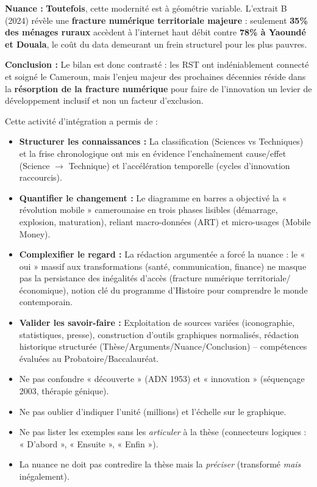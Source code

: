 \documentclass[11pt]{article}
\newcounter{popsec}
\newcounter{popsub}
\newcommand{\courssub}[1]{%
  \stepcounter{popsub}%
  \par\vspace{9pt}\noindent{\popxbold\fontsize{11.5}{13}\selectfont\color{popink}{\color{poporange}\thepopsec.\thepopsub}\hspace{6pt}#1}\par\nopagebreak\vspace{4pt}
}
\begin{document}
\begin{exoresolu}
\medskip
\noindent \textbf{Nuance :} \textbf{Toutefois}, cette modernité est à géométrie variable. L'extrait B (2024) révèle une \textbf{fracture numérique territoriale majeure} : seulement \textbf{35\% des ménages ruraux} accèdent à l'internet haut débit contre \textbf{78\% à Yaoundé et Douala}, le coût du data demeurant un frein structurel pour les plus pauvres.

\medskip
\noindent \textbf{Conclusion :} Le bilan est donc contrasté : les RST ont indéniablement connecté et soigné le Cameroun, mais l'enjeu majeur des prochaines décennies réside dans la \textbf{résorption de la fracture numérique} pour faire de l'innovation un levier de développement inclusif et non un facteur d'exclusion.
\end{exoresolu}

\courssub{Bilan de l'activité}
Cette activité d'intégration a permis de :
\begin{itemize}
    \item \textbf{Structurer les connaissances :} La classification (Sciences vs Techniques) et la frise chronologique ont mis en évidence l'enchaînement cause/effet (Science $\to$ Technique) et l'accélération temporelle (cycles d'innovation raccourcis).
    \item \textbf{Quantifier le changement :} Le diagramme en barres a objectivé la « révolution mobile » camerounaise en trois phases lisibles (démarrage, explosion, maturation), reliant macro-données (ART) et micro-usages (Mobile Money).
    \item \textbf{Complexifier le regard :} La rédaction argumentée a forcé la nuance : le « oui » massif aux transformations (santé, communication, finance) ne masque pas la persistance des inégalités d'accès (fracture numérique territoriale/économique), notion clé du programme d'Histoire pour comprendre le monde contemporain.
    \item \textbf{Valider les savoir-faire :} Exploitation de sources variées (iconographie, statistiques, presse), construction d'outils graphiques normalisés, rédaction historique structurée (Thèse/Arguments/Nuance/Conclusion) -- compétences évaluées au Probatoire/Baccalauréat.
\end{itemize}

\begin{attention}
\begin{itemize}
\item Ne pas confondre « découverte » (ADN 1953) et « innovation » (séquençage 2003, thérapie génique).
\item Ne pas oublier d'indiquer l'unité (millions) et l'échelle sur le graphique.
\item Ne pas lister les exemples sans les \emph{articuler} à la thèse (connecteurs logiques : « D'abord », « Ensuite », « Enfin »).
\item La nuance ne doit pas contredire la thèse mais la \emph{préciser} (transformé \emph{mais} inégalement).
\end{itemize}
\end{attention}
\end{document}
